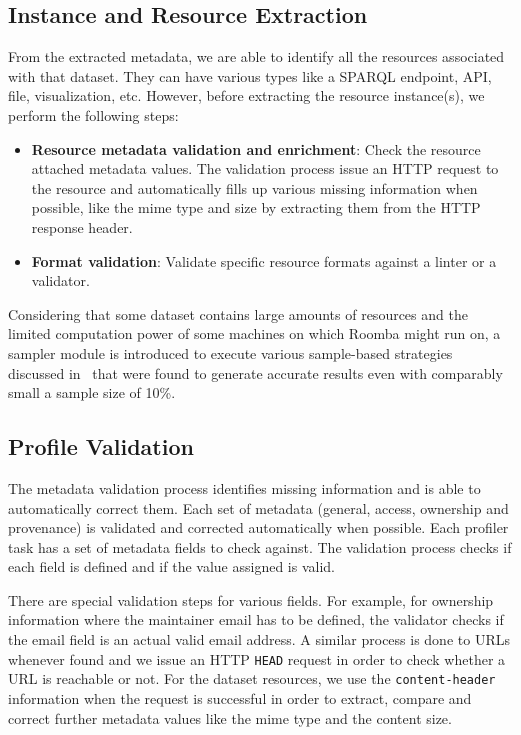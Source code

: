 \documentclass{../../Tools/LaTEX/sig-alternate}
\begin{document}
\subsection{Instance and Resource Extraction}
From the extracted metadata, we are able to identify all the resources associated with that dataset. They can have various types like a SPARQL endpoint, API, file, visualization, etc. However, before extracting the resource instance(s), we perform the following steps:
\begin{itemize}
  \item \textbf{Resource metadata validation and enrichment}: Check the resource attached metadata values. The validation process issue an HTTP request to the resource and automatically fills up various missing information when possible, like the mime type and size by extracting them from the HTTP response header.
  \item \textbf{Format validation}: Validate specific resource formats against a linter or a validator.
\end{itemize}

Considering that some dataset contains large amounts of resources and the limited computation power of some machines on which Roomba might run on, a sampler module is introduced to execute various sample-based strategies discussed in~\cite{Fetahu:ESWC:14} that were found to generate accurate results even with comparably small a sample size of 10\%.

\subsection{Profile Validation}
The metadata validation process identifies missing information and is able to automatically correct them. Each set of metadata (general, access, ownership and provenance) is validated and corrected automatically when possible. Each profiler task has a set of metadata fields to check against. The validation process checks if each field is defined and if the value assigned is valid.

There are special validation steps for various fields. For example, for ownership information where the maintainer email has to be defined, the validator checks if the email field is an actual valid email address. A similar process is done to URLs whenever found and we issue an HTTP \texttt{HEAD} request in order to check whether a URL is reachable or not. For the dataset resources, we use the \texttt{content-header} information when the request is successful in order to extract, compare and correct further metadata values like the mime type and the content size.
\end{document}
